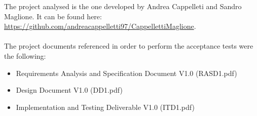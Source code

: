 The project analysed is the one developed by Andrea Cappelleti and Sandro Maglione. It can be found here: \url{https://github.com/andreacappelletti97/CappellettiMaglione}.
\\\\
The project documents referenced in order to perform the acceptance tests were the following:
\\
\begin{itemize}
    \item 
    Requirements Analysis and Specification Document V1.0 (RASD1.pdf)
    \item
    Design Document V1.0 (DD1.pdf)
    \item
    Implementation and Testing Deliverable V1.0 (ITD1.pdf) 
\end{itemize}

